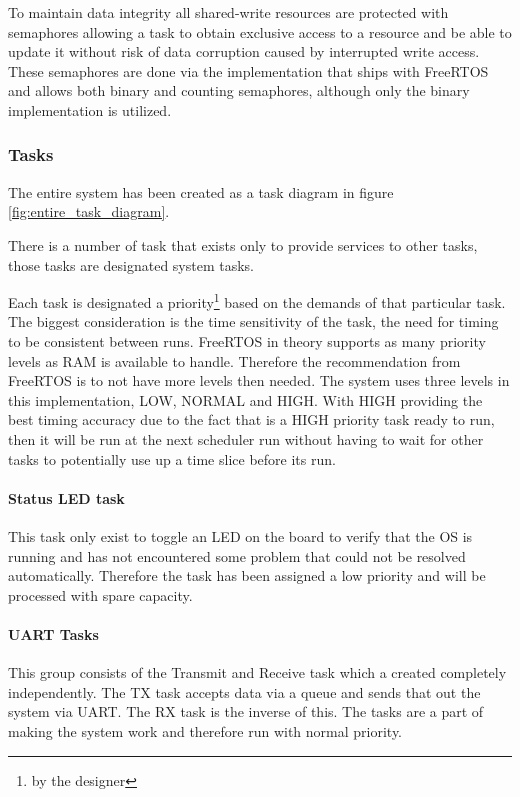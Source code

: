 \documentclass[../../../main]{subfiles}
\begin{document}
To maintain data integrity all shared-write resources are protected with semaphores allowing a task to obtain exclusive access to a resource and be able to update it without risk of data corruption caused by interrupted write access.
These semaphores are done via the implementation that ships with FreeRTOS and allows both binary and counting semaphores, although only the binary implementation is utilized.



\subsubsection{Tasks}

The entire system has been created as a task diagram in figure \ref{fig:entire_task_diagram}.

There is a number of task that exists only to provide services to other tasks, those tasks are designated system tasks.

Each task is designated a priority\footnote{by the designer} based on the demands of that particular task. The biggest consideration is the time sensitivity of the task, the need for timing to be consistent between runs. FreeRTOS in theory supports as many priority levels as RAM is available to handle. Therefore the recommendation from FreeRTOS is to not have more levels then needed. The system uses three levels in this implementation, LOW, NORMAL and HIGH. With HIGH providing the best timing accuracy due to the fact that is a HIGH priority task  ready to run, then it will be run at the next scheduler run without having to wait for other tasks to potentially use up a time slice before its run.


\paragraph{Status LED task}

This task only exist to toggle an LED on the board to verify that the OS is running and has not encountered some problem that could not be resolved automatically. Therefore the task has been assigned a low priority and will be processed with spare capacity.

\paragraph{UART Tasks}%

This group consists of the Transmit and Receive task which a created completely independently. The TX task accepts data via a queue and sends that out the system via UART. The RX task is the inverse of this. The tasks are a part of making the system work and therefore run with normal priority.
\end{document}

